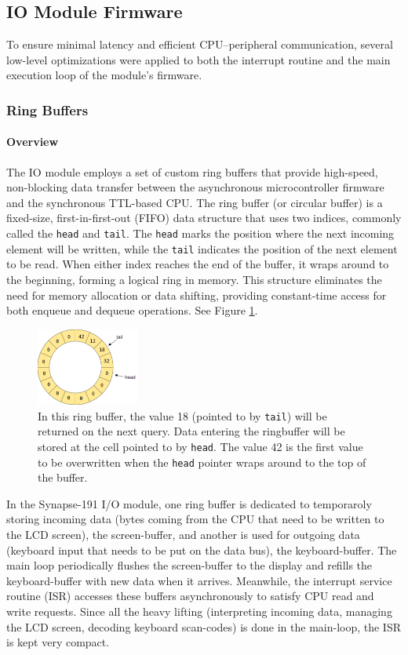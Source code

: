 \subsection{IO Module Firmware}
To ensure minimal latency and efficient CPU--peripheral communication, several low-level optimizations were applied to both the interrupt routine and the main execution loop of the module's firmware. 

\subsubsection{Ring Buffers}
\paragraph{Overview} The IO module employs a set of custom ring buffers that provide high-speed, non-blocking data transfer between the asynchronous microcontroller firmware and the synchronous TTL-based CPU. The ring buffer (or circular buffer) is a fixed-size, first-in-first-out (FIFO) data structure that uses two indices, commonly called the \texttt{head} and \texttt{tail}. The \texttt{head} marks the position where the next incoming element will be written, while the \texttt{tail} indicates the position of the next element to be read. When either index reaches the end of the buffer, it wraps around to the beginning, forming a logical ring in memory. This structure eliminates the need for memory allocation or data shifting, providing constant-time access for both enqueue and dequeue operations. See Figure \ref{fig:ringbuffer}.

\begin{figure}[H]
  \centering
  \includegraphics[width=0.3\textwidth]{img/ringbuffer}
  \caption{In this ring buffer, the value 18 (pointed to by \texttt{tail}) will be returned on the next query. Data entering the ringbuffer will be stored at the cell pointed to by \texttt{head}. The value 42 is the first value to be overwritten when the \texttt{head} pointer wraps around to the top of the buffer.}
  \label{fig:ringbuffer}
\end{figure}


In the Synapse-191 I/O module, one ring buffer is dedicated to temporaroly storing incoming data (bytes coming from the CPU that need to be written to the LCD screen), the screen-buffer, and another is used for outgoing data (keyboard input that needs to be put on the data bus), the keyboard-buffer. The main loop periodically flushes the screen-buffer to the display and refills the keyboard-buffer with new data when it arrives. Meanwhile, the interrupt service routine (ISR) accesses these buffers asynchronously to satisfy CPU read and write requests. Since all the heavy lifting (interpreting incoming data, managing the LCD screen, decoding keyboard scan-codes) is done in the main-loop, the ISR is kept very compact.

